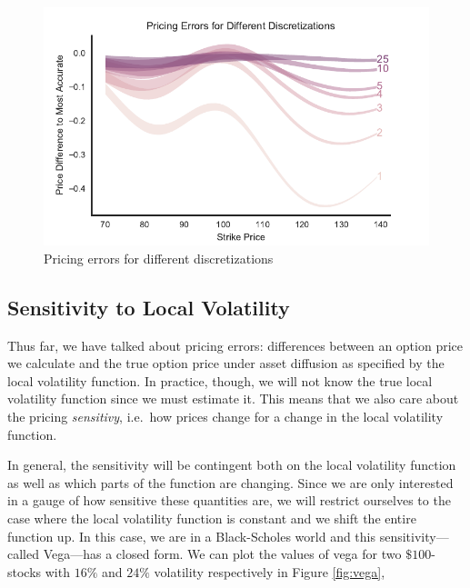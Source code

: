 \documentclass[12pt]{article}
\numberwithin{equation}{section}
\begin{document}
\begin{figure}[h!]
\centering
\includegraphics{figs/discretizationK.pdf}
\caption{Pricing errors for different discretizations}
\label{fig:discretizationK}
\end{figure}


\subsection{Sensitivity to Local Volatility}

Thus far, we have talked about pricing errors: differences between an option
price we calculate and the true option price under asset diffusion as specified
by the local volatility function. In practice, though, we will not know the true
local volatility function since we must estimate it. This means that we also
care about the pricing \emph{sensitivy}, i.e.\ how prices change for a change in
the local volatility function.

In general, the sensitivity will be contingent both on the local volatility
function as well as which parts of the function are changing. Since we are only
interested in a gauge of how sensitive these quantities are, we will restrict
ourselves to the case where the local volatility function is constant and we
shift the entire function up. In this case, we are in a Black-Scholes world and
this sensitivity---called Vega---has a closed form. We can plot the values of
vega for two $\$100$-stocks with $16\%$ and $24\%$ volatility respectively in
Figure \ref{fig:vega},
\end{document}
